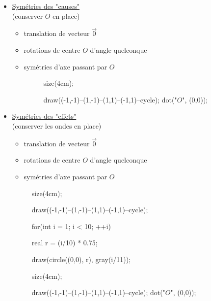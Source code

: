 \begin{itemize}
	\item \underline{Symétries des "causes"}\\
		(conserver $O$ en place)
		\vspace{2mm}

		\begin{itemize}
			\item translation de vecteur $\vec{0}$
			\item rotations de centre $O$ d'angle quelconque	
			\item symétries d'axe passant par $O$ 
				\begin{figure}[H]
					\center
					\begin{asy}
						size(4cm);

						draw((-1,-1)--(1,-1)--(1,1)--(-1,1)--cycle);
						dot("$O$", (0,0));
					\end{asy}
				\end{figure}
		\end{itemize}

		\vspace{5mm}

	\item \underline{Symétries des "effets"}\\
		(conserver les ondes en place)
		\vspace{2mm}

		\begin{itemize}
			\item translation de vecteur $\vec{0}$
			\item rotations de centre $O$ d'angle quelconque
			\item symétries d'axe passant par $O$
		\end{itemize}
		\begin{figure}[H]
			\center
			\begin{asy}
				size(4cm);

				draw((-1,-1)--(1,-1)--(1,1)--(-1,1)--cycle);

				for(int i = 1; i < 10; ++i) {
					real r = (i/10) * 0.75;

					draw(circle((0,0), r), gray(i/11));
				}
			\end{asy}
		\end{figure}
		
		\begin{figure}[H]
			\center
			\begin{asy}
				size(4cm);

				draw((-1,-1)--(1,-1)--(1,1)--(-1,1)--cycle);
				dot("$O$", (0,0));


\end{asy}
\end{figure}
\end{itemize}
